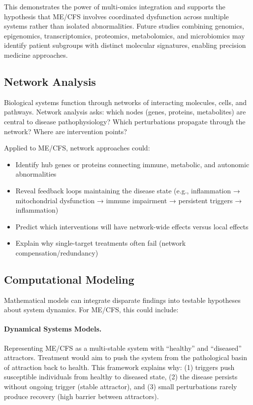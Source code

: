 This demonstrates the power of multi-omics integration and supports the hypothesis that ME/CFS involves coordinated dysfunction across multiple systems rather than isolated abnormalities. Future studies combining genomics, epigenomics, transcriptomics, proteomics, metabolomics, and microbiomics may identify patient subgroups with distinct molecular signatures, enabling precision medicine approaches.

\subsection{Network Analysis}

Biological systems function through networks of interacting molecules, cells, and pathways. Network analysis asks: which nodes (genes, proteins, metabolites) are central to disease pathophysiology? Which perturbations propagate through the network? Where are intervention points?

Applied to ME/CFS, network approaches could:
\begin{itemize}
    \item Identify hub genes or proteins connecting immune, metabolic, and autonomic abnormalities
    \item Reveal feedback loops maintaining the disease state (e.g., inflammation → mitochondrial dysfunction → immune impairment → persistent triggers → inflammation)
    \item Predict which interventions will have network-wide effects versus local effects
    \item Explain why single-target treatments often fail (network compensation/redundancy)
\end{itemize}

\subsection{Computational Modeling}

Mathematical models can integrate disparate findings into testable hypotheses about system dynamics. For ME/CFS, this could include:

\paragraph{Dynamical Systems Models.}
Representing ME/CFS as a multi-stable system with ``healthy'' and ``diseased'' attractors. Treatment would aim to push the system from the pathological basin of attraction back to health. This framework explains why: (1) triggers push susceptible individuals from healthy to diseased state, (2) the disease persists without ongoing trigger (stable attractor), and (3) small perturbations rarely produce recovery (high barrier between attractors).

